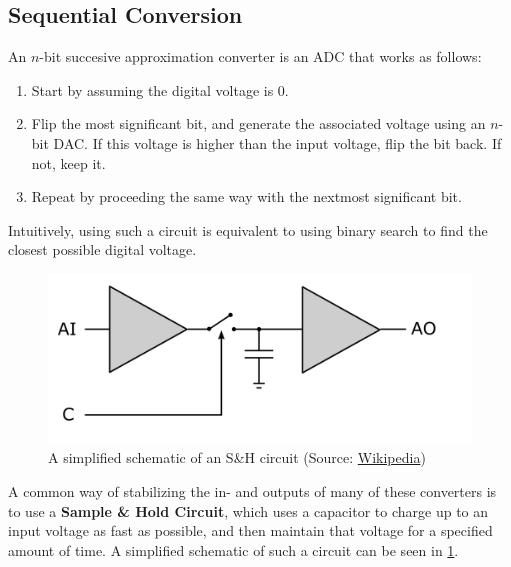 \documentclass{report}
\newcommand{\tbf}{\textbf}
\newcommand*{\newpar}{\par\vspace{\baselineskip}\noindent} %
\begin{document}
\subsection{Sequential Conversion}
An $n$-bit succesive approximation converter is an ADC that works as follows:
\begin{enumerate}
 \item Start by assuming the digital voltage is $0$.
 \item Flip the most significant bit, and generate the associated voltage using an $n$-bit DAC. If this voltage is higher than the input voltage, flip the bit back. If not, keep it.
 \item Repeat by proceeding the same way with the nextmost significant bit.
\end{enumerate}
Intuitively, using such a circuit is equivalent to using binary search to find the closest possible digital voltage.
\begin{figure}[h!]
\centering
\includegraphics[scale=0.25]{figures/SH}
\caption{A simplified schematic of an S\&H circuit (Source: \href{https://en.wikipedia.org/wiki/File:Sample-hold-circuit.svg}{Wikipedia})}
\label{fig:SH}
\end{figure}
\newpar
A common way of stabilizing the in- and outputs of many of these converters is to use a \tbf{Sample \& Hold Circuit}, which uses a capacitor to charge up to an input voltage as fast as possible, and then maintain that voltage for a specified amount of time. A simplified schematic of such a circuit can be seen in \ref{fig:SH}.
%
\clearpage
\end{document}
